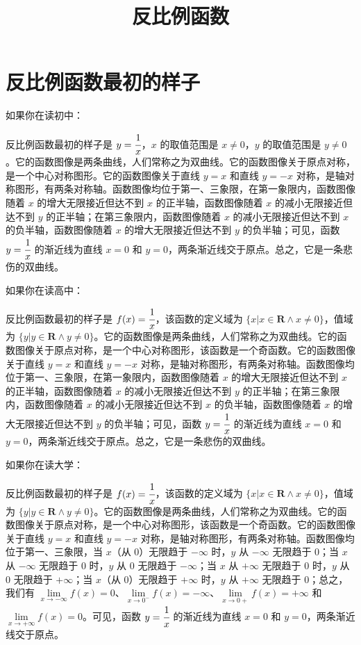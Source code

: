 \documentclass[a4paper]{article}
\begin{document}
\title{反比例函数}

\maketitle

\section{反比例函数最初的样子}

如果你在读初中：

反比例函数最初的样子是 $y = \cfrac{1}{x}$，$x$ 的取值范围是 $x \neq 0$，$y$ 的取值范围是 $y \neq 0$。它的函数图像是两条曲线，人们常称之为双曲线。它的函数图像关于原点对称，是一个中心对称图形。它的函数图像关于直线 $y = x$ 和直线 $y = -x$ 对称，是轴对称图形，有两条对称轴。函数图像均位于第一、三象限，在第一象限内，函数图像随着 $x$ 的增大无限接近但达不到 $x$ 的正半轴，函数图像随着 $x$ 的减小无限接近但达不到 $y$ 的正半轴；在第三象限内，函数图像随着 $x$ 的减小无限接近但达不到 $x$ 的负半轴，函数图像随着 $x$ 的增大无限接近但达不到 $y$ 的负半轴；可见，函数 $y = \cfrac{1}{x}$ 的渐近线为直线 $x = 0$ 和 $y = 0$，两条渐近线交于原点。总之，它是一条悲伤的双曲线。

如果你在读高中：

反比例函数最初的样子是 $f(x) = \cfrac{1}{x}$，该函数的定义域为 $\{x | x \in \mathbf{R} \land x \neq 0\}$，值域为 $\{y | y \in \mathbf{R} \land y \neq 0\}$。它的函数图像是两条曲线，人们常称之为双曲线。它的函数图像关于原点对称，是一个中心对称图形，该函数是一个奇函数。它的函数图像关于直线 $y = x$ 和直线 $y = -x$ 对称，是轴对称图形，有两条对称轴。函数图像均位于第一、三象限，在第一象限内，函数图像随着 $x$ 的增大无限接近但达不到 $x$ 的正半轴，函数图像随着 $x$ 的减小无限接近但达不到 $y$ 的正半轴；在第三象限内，函数图像随着 $x$ 的减小无限接近但达不到 $x$ 的负半轴，函数图像随着 $x$ 的增大无限接近但达不到 $y$ 的负半轴；可见，函数 $y = \cfrac{1}{x}$ 的渐近线为直线 $x = 0$ 和 $y = 0$，两条渐近线交于原点。总之，它是一条悲伤的双曲线。

如果你在读大学：

反比例函数最初的样子是 $f(x) = \cfrac{1}{x}$，该函数的定义域为 $\{x | x \in \mathbf{R} \land x \neq 0\}$，值域为 $\{y | y \in \mathbf{R} \land y \neq 0\}$。它的函数图像是两条曲线，人们常称之为双曲线。它的函数图像关于原点对称，是一个中心对称图形，该函数是一个奇函数。它的函数图像关于直线 $y = x$ 和直线 $y = -x$ 对称，是轴对称图形，有两条对称轴。函数图像均位于第一、三象限，当 $x$（从 $0$）无限趋于 $-\infty$ 时，$y$ 从 $-\infty$ 无限趋于 $0$；当 $x$ 从 $-\infty$ 无限趋于 $0$ 时，$y$ 从 $0$ 无限趋于 $-\infty$；当 $x$ 从 $+\infty$ 无限趋于 $0$ 时，$y$ 从 $0$ 无限趋于 $+\infty$；当 $x$（从 $0$）无限趋于 $+\infty$ 时，$y$ 从 $+\infty$ 无限趋于 $0$；总之，我们有 $\lim\limits_{x \to -\infty} f(x) = 0$、$\lim\limits_{x \to 0^-} f(x) = -\infty$、$\lim\limits_{x \to 0+} f(x) = +\infty$ 和 $\lim\limits_{x \to +\infty} f(x) = 0$。可见，函数 $y = \cfrac{1}{x}$ 的渐近线为直线 $x = 0$ 和 $y = 0$，两条渐近线交于原点。
\end{document}
